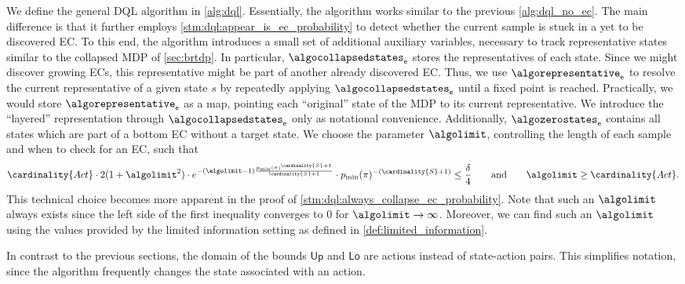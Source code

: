 \documentclass{theoretics}
\newcommand{\States}{S}
\newcommand{\Actions}{Act}
\newcommand{\strategy}{\pi}
\newcommand{\upperbound}{\mathsf{Up}}
\newcommand{\lowerbound}{\mathsf{Lo}}
\newcommand{\algoepisode}{\mathsf{e}}
\begin{document}
    
We define the general DQL algorithm in \cref{alg:dql}.
Essentially, the algorithm works similar to the previous \cref{alg:dql_no_ec}.
The main difference is that it further employs \cref{stm:dql:appear_is_ec_probability} to detect whether the current sample is stuck in a yet to be discovered EC.
To this end, the algorithm introduces a small set of additional auxiliary variables, necessary to track representative states similar to the collapsed MDP of \cref{sec:brtdp}.
In particular, $\algocollapsedstates_\algoepisode$ stores the representatives of each state.
Since we might discover growing ECs, this representative might be part of another already discovered EC.
Thus, we use $\algorepresentative_\algoepisode$ to resolve the current representative of a given state $s$ by repeatedly applying $\algocollapsedstates_\algoepisode$ until a fixed point is reached.
Practically, we would store $\algorepresentative_\algoepisode$ as a map, pointing each \enquote{original} state of the MDP to its current representative.
We introduce the \enquote{layered} representation through $\algocollapsedstates_\algoepisode$ only as notational convenience.
Additionally, $\algozerostates_\algoepisode$ contains all states which are part of a bottom EC without a target state.
We choose the parameter $\algolimit$, controlling the length of each sample and when to check for an EC, such that
\begin{equation}
	\cardinality{\Actions} \cdot 2 (1 + \algolimit^2) \cdot e^{- (\algolimit - 1) \frac{p_{\min}(\strategy)^{\cardinality{\States} + 1}}{\cardinality{\States} + 1}} \cdot p_{\min}(\strategy)^{-(\cardinality{\States}+1)} \leq \frac{\delta}{4} \qquad \text{and} \qquad \algolimit \geq \cardinality{\Actions}. \label{eq:dql:choice_of_limit}
\end{equation}
This technical choice becomes more apparent in the proof of \cref{stm:dql:always_collapse_ec_probability}.
Note that such an $\algolimit$ always exists since the left side of the first inequality converges to $0$ for $\algolimit \to \infty$.
Moreover, we can find such an $\algolimit$ using the values provided by the limited information setting as defined in \cref{def:limited_information}.

\begin{remark}
	In contrast to the previous sections, the domain of the bounds $\upperbound$ and $\lowerbound$ are actions instead of state-action pairs.
	This simplifies notation, since the algorithm frequently changes the state associated with an action.
\end{remark}
\end{document}
